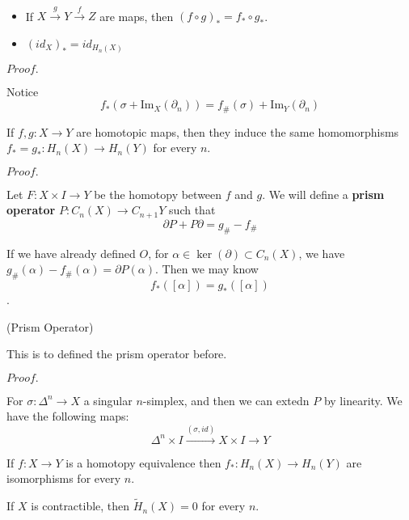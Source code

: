 \documentclass{article}
\newcommand{\Pf}[1]{$Proof.$\par}
\begin{document}
\begin{proposition}\ \par
    \begin{itemize}
        \item If $X\overset{g}{\rightarrow}Y\overset{f}{\rightarrow}Z$ are maps, then $(f\circ g)_* = f_* \circ g_*$.
        \item $(id_X)_* = id_{H_n(X)}$
    \end{itemize}
\end{proposition}
\Pf\par
    Notice
    \[f_*(\sigma + \text{Im}_X(\partial_n)) = f_{\#}(\sigma) + \text{Im}_Y(\partial_n) \]

\begin{theorem}
    If $f,g:X\to Y$ are homotopic maps, then they induce the same homomorphisms $f_* = g_*:H_n(X)\to H_n(Y)$ for every $n$.
\end{theorem}
\Pf\par
    Let $F:X\times I \to Y$ be the homotopy between $f$ and $g$. We will define a \textbf{prism operator} $P:C_n(X) \to C_{n+1}Y$ such that
    \[\partial P + P \partial = g_{\#} - f_{\#}\]\par
    If we have already defined $O$, for $\alpha \in \ker(\partial)\subset C_n(X)$, we have $g_{\#}(\alpha) - f_{\#}(\alpha) = \partial P(\alpha)$. Then we may know
    \[
    f_*([\alpha]) = g_*([\alpha])
    \].\par

\begin{definition}(Prism Operator)\par
    This is to defined the prism operator before.
\end{definition}
\Pf\par
    For $\sigma:\Delta^n \to X$ a singular $n$-simplex, and then we can extedn $P$ by linearity. We have the following maps:
    \[\Delta^n \times I \overset{(\sigma,id)}{\rightarrow} X\times I \to Y\]

\begin{corollary}
    If $f:X\to Y$ is a homotopy equivalence then $f_*:H_n(X)\to H_n(Y)$ are isomorphisms for every $n$.
\end{corollary}

\begin{corollary}
    If $X$ is contractible, then $\widetilde{H}_n(X) = 0$ for every $n$.
\end{corollary}
\end{document}
